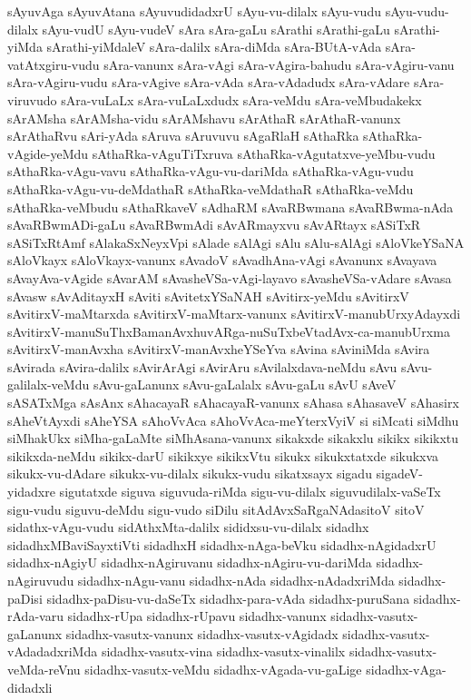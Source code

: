 {sAyuvAga
sAyuvAtana
sAyuvudidadxrU
sAyu-vu-dilalx
sAyu-vudu
sAyu-vudu-dilalx
sAyu-vudU
sAyu-vudeV
sAra
sAra-gaLu
sArathi
sArathi-gaLu
sArathi-yiMda
sArathi-yiMdaleV
sAra-dalilx
sAra-diMda
sAra-BUtA-vAda
sAra-vatAtxgiru-vudu
sAra-vanunx
sAra-vAgi
sAra-vAgira-bahudu
sAra-vAgiru-vanu
sAra-vAgiru-vudu
sAra-vAgive
sAra-vAda
sAra-vAdadudx
sAra-vAdare
sAra-viruvudo
sAra-vuLaLx
sAra-vuLaLxdudx
sAra-veMdu
sAra-veMbudakekx
sArAMsha
sArAMsha-vidu
sArAMshavu
sArAthaR
sArAthaR-vanunx
sArAthaRvu
sAri-yAda
sAruva
sAruvuvu
sAgaRlaH
sAthaRka
sAthaRka-vAgide-yeMdu
sAthaRka-vAguTiTxruva
sAthaRka-vAgutatxve-yeMbu-vudu
sAthaRka-vAgu-vavu
sAthaRka-vAgu-vu-dariMda
sAthaRka-vAgu-vudu
sAthaRka-vAgu-vu-deMdathaR
sAthaRka-veMdathaR
sAthaRka-veMdu
sAthaRka-veMbudu
sAthaRkaveV
sAdhaRM
sAvaRBwmana
sAvaRBwma-nAda
sAvaRBwmADi-gaLu
sAvaRBwmAdi
sAvARmayxvu
sAvARtayx
sASiTxR
sASiTxRtAmf
sAlakaSxNeyxVpi
sAlade
sAlAgi
sAlu
sAlu-sAlAgi
sAloVkeYSaNA
sAloVkayx
sAloVkayx-vanunx
sAvadoV
sAvadhAna-vAgi
sAvanunx
sAvayava
sAvayAva-vAgide
sAvarAM
sAvasheVSa-vAgi-layavo
sAvasheVSa-vAdare
sAvasa
sAvasw
sAvAditayxH
sAviti
sAvitetxYSaNAH
sAvitirx-yeMdu
sAvitirxV
sAvitirxV-maMtarxda
sAvitirxV-maMtarx-vanunx
sAvitirxV-manubUrxyAdayxdi
sAvitirxV-manuSuThxBamanAvxhuvARga-nuSuTxbeVtadAvx-ca-manubUrxma
sAvitirxV-manAvxha
sAvitirxV-manAvxheYSeYva
sAvina
sAviniMda
sAvira
sAvirada
sAvira-dalilx
sAvirArAgi
sAvirAru
sAvilalxdava-neMdu
sAvu
sAvu-galilalx-veMdu
sAvu-gaLanunx
sAvu-gaLalalx
sAvu-gaLu
sAvU
sAveV
sASATxMga
sAsAnx
sAhacayaR
sAhacayaR-vanunx
sAhasa
sAhasaveV
sAhasirx
sAheVtAyxdi
sAheYSA
sAhoVvAca
sAhoVvAca-meYterxVyiV
si
siMcati
siMdhu
siMhakUkx
siMha-gaLaMte
siMhAsana-vanunx
sikakxde
sikakxlu
sikikx
sikikxtu
sikikxda-neMdu
sikikx-darU
sikikxye
sikikxVtu
sikukx
sikukxtatxde
sikukxva
sikukx-vu-dAdare
sikukx-vu-dilalx
sikukx-vudu
sikatxsayx
sigadu
sigadeV-yidadxre
sigutatxde
siguva
siguvuda-riMda
sigu-vu-dilalx
siguvudilalx-vaSeTx
sigu-vudu
siguvu-deMdu
sigu-vudo
siDilu
sitAdAvxSaRgaNAdasitoV
sitoV
sidathx-vAgu-vudu
sidAthxMta-dalilx
sididxsu-vu-dilalx
sidadhx
sidadhxMBaviSayxtiVti
sidadhxH
sidadhx-nAga-beVku
sidadhx-nAgidadxrU
sidadhx-nAgiyU
sidadhx-nAgiruvanu
sidadhx-nAgiru-vu-dariMda
sidadhx-nAgiruvudu
sidadhx-nAgu-vanu
sidadhx-nAda
sidadhx-nAdadxriMda
sidadhx-paDisi
sidadhx-paDisu-vu-daSeTx
sidadhx-para-vAda
sidadhx-puruSana
sidadhx-rAda-varu
sidadhx-rUpa
sidadhx-rUpavu
sidadhx-vanunx
sidadhx-vasutx-gaLanunx
sidadhx-vasutx-vanunx
sidadhx-vasutx-vAgidadx
sidadhx-vasutx-vAdadadxriMda
sidadhx-vasutx-vina
sidadhx-vasutx-vinalilx
sidadhx-vasutx-veMda-reVnu
sidadhx-vasutx-veMdu
sidadhx-vAgada-vu-gaLige
sidadhx-vAga-didadxli
}
